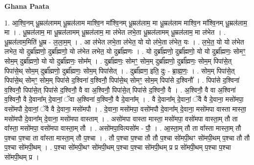 \documentclass[17pt]{extarticle}
\begin{document}
\textbf{Ghana Paata } \newline

1. आ॒श्वि॒नम् धू॒म्रल॑लामम् धू॒म्रल॑लाम माश्वि॒न मा᳚श्वि॒नम् धू॒म्रल॑लाम॒ मा धू॒म्रल॑लाम माश्वि॒न मा᳚श्वि॒नम् धू॒म्रल॑लाम॒ मा । . धू॒म्रल॑लाम॒ मा धू॒म्रल॑लामम् धू॒म्रल॑लाम॒ मा ल॑भेत लभे॒ता धू॒म्रल॑लामम् धू॒म्रल॑लाम॒ मा ल॑भेत । . धू॒म्रल॑लाम॒मिति॑ धू॒म्र - ल॒ला॒म॒म् । . आ ल॑भेत लभे॒ता ल॑भेत॒ यो यो ल॑भे॒ता ल॑भेत॒ यः । . ल॒भे॒त॒ यो यो ल॑भेत लभेत॒ यो दुर्ब्रा᳚ह्मणो॒ दुर्ब्रा᳚ह्मणो॒ यो ल॑भेत लभेत॒ यो दुर्ब्रा᳚ह्मणः । . यो दुर्ब्रा᳚ह्मणो॒ दुर्ब्रा᳚ह्मणो॒ यो यो दुर्ब्रा᳚ह्मणः॒ सोमꣳ॒॒ सोम॒म् दुर्ब्रा᳚ह्मणो॒ यो यो दुर्ब्रा᳚ह्मणः॒ सोम᳚म् । . दुर्ब्रा᳚ह्मणः॒ सोमꣳ॒॒ सोम॒म् दुर्ब्रा᳚ह्मणो॒ दुर्ब्रा᳚ह्मणः॒ सोम॒म् पिपा॑से॒त् पिपा॑से॒थ् सोम॒म् दुर्ब्रा᳚ह्मणो॒ दुर्ब्रा᳚ह्मणः॒ सोम॒म् पिपा॑सेत् । . दुर्ब्रा᳚ह्मण॒ इति॒ दुः - ब्रा॒ह्म॒णः॒ । . सोम॒म् पिपा॑से॒त् पिपा॑से॒थ् सोमꣳ॒॒ सोम॒म् पिपा॑से द॒श्विना॑ व॒श्विनौ॒ पिपा॑से॒थ् सोमꣳ॒॒ सोम॒म् पिपा॑से द॒श्विनौ᳚ । . पिपा॑से द॒श्विना॑ व॒श्विनौ॒ पिपा॑से॒त् पिपा॑से द॒श्विनौ॒ वै वा अ॒श्विनौ॒ पिपा॑से॒त् पिपा॑से द॒श्विनौ॒ वै । . अ॒श्विनौ॒ वै वा अ॒श्विना॑ व॒श्विनौ॒ वै दे॒वाना᳚म् दे॒वानां॒ ॅवा अ॒श्विना॑ व॒श्विनौ॒ वै दे॒वाना᳚म् । . वै दे॒वाना᳚म् दे॒वानां॒ ॅवै वै दे॒वाना॒ मसो॑मपा॒ वसो॑मपौ दे॒वानां॒ ॅवै वै दे॒वाना॒ मसो॑मपौ । . दे॒वाना॒ मसो॑मपा॒ वसो॑मपौ दे॒वाना᳚म् दे॒वाना॒ मसो॑मपा वास्ता मास्ता॒ मसो॑मपौ दे॒वाना᳚म् दे॒वाना॒ मसो॑मपा वास्ताम् । . असो॑मपा वास्ता मास्ता॒ मसो॑मपा॒ वसो॑मपा वास्ता॒म् तौ ता वा᳚स्ता॒ मसो॑मपा॒ वसो॑मपा वास्ता॒म् तौ । . असो॑मपा॒वित्यसो॑म - पौ॒ । . आ॒स्ता॒म् तौ ता वा᳚स्ता मास्ता॒म् तौ प॒श्चा प॒श्चा ता वा᳚स्ता मास्ता॒म् तौ प॒श्चा । . तौ प॒श्चा प॒श्चा तौ तौ प॒श्चा सो॑मपी॒थꣳ सो॑मपी॒थम् प॒श्चा तौ तौ प॒श्चा सो॑मपी॒थम् । . प॒श्चा सो॑मपी॒थꣳ सो॑मपी॒थम् प॒श्चा प॒श्चा सो॑मपी॒थम् प्र प्र सो॑मपी॒थम् प॒श्चा प॒श्चा सो॑मपी॒थम् प्र । \newline
\end{document}
